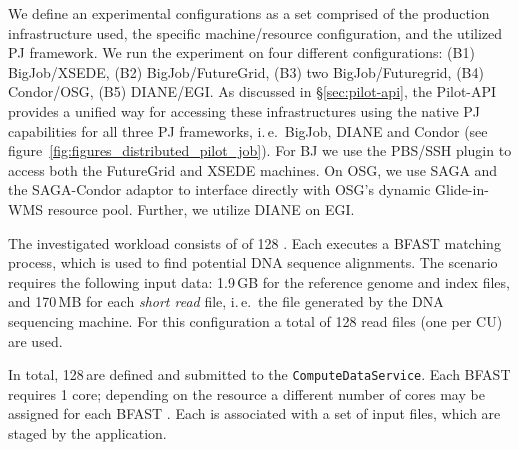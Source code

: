 \documentclass[conference]{IEEEtran}
\begin{document}
We define an experimental configurations as a set comprised of the
production infrastructure used, the specific machine/resource
configuration, and the utilized PJ framework.  We run the experiment
on four different configurations: (B1) BigJob/XSEDE, (B2)
BigJob/FutureGrid, (B3) two BigJob/Futuregrid, (B4) Condor/OSG, 
(B5) DIANE/EGI. As discussed in
\S\ref{sec:pilot-api}, the Pilot-API provides a unified way for
accessing these infrastructures using the native PJ capabilities for
all three PJ frameworks, i.\,e.\ BigJob, DIANE and Condor (see
figure~\ref{fig:figures_distributed_pilot_job}).  For BJ we use the
PBS/SSH plugin to access both the FutureGrid and XSEDE machines. 
On OSG, we use SAGA and the SAGA-Condor adaptor to interface directly 
with OSG's dynamic Glide-in-WMS resource pool. Further, we utilize 
DIANE on EGI. 

The investigated workload consists of of 128 \cus. Each \cu executes a
BFAST matching process, which is used to find potential DNA sequence
alignments. The scenario requires the following input data: 1.9\,GB for
the reference genome and index files, and 170\,MB for each 
\textit{short read} file, i.\,e.\ the file generated by the DNA 
sequencing machine. For this configuration a total of 128 read files (one per CU) 
are used. 

In total, 128\,\cus are defined and submitted to the
\texttt{Compute\-Data\-Service}. Each BFAST \cu requires 1 core;
depending on the resource a different number of cores may be assigned
for each BFAST \cu. Each \cu is associated with a
set of input files, which are staged by the application.




\end{document}
